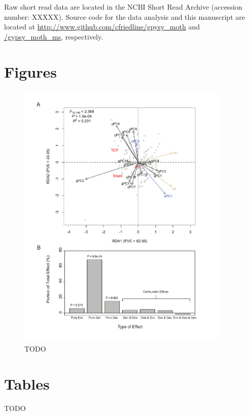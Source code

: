 \documentclass[smallextended]{svjour3}
\newcommand{\beginsupplement}{%
        \setcounter{table}{0}
        \renewcommand{\thetable}{S\arabic{table}}
        \setcounter{figure}{0}
        \renewcommand{\thefigure}{S\arabic{figure}}
        \renewcommand{\thesection}{S\arabic{section}}
        \renewcommand{\thesubsection}{S\arabic{subsection}}
     }
\begin{document}
Raw short read data are located in the NCBI Short Read Archive (accession
number: XXXXX). Source code for the data analysis and this manuscript are
located at
\url{http://www.github.com/cfriedline/gpysy_moth} and \url{/gypsy_moth_ms},
respectively.


\clearpage



\clearpage


\section*{Figures}
\begin{figure}[ht]
\centering
\includegraphics[width=0.9\textwidth]{rda_fig}
\caption{TODO}
\label{fig:rda}
\end{figure}

\clearpage

\section*{Tables}
TODO


\clearpage


\beginsupplement%
\end{document}
